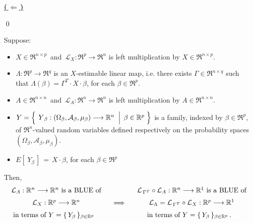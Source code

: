 \vskip 0.5cm
\noindent
\textbf{\underline{(\,$\Longleftarrow$\,)}}\quad

\qed

\begin{proposition}
\mbox{}\vskip 0.1cm\noindent
Suppose:
\begin{itemize}
\item
	$X \in \Re^{n \times p}$\, and 
	\,$\mathcal{L}_{X} : \Re^{p} \longrightarrow \Re^{n}$ is left multiplication by $X \in \Re^{n \times p}$.
\item
	$\Lambda : \Re^{p} \longrightarrow \Re^{q}$ is an $X$-estimable linear map, i.e.
	there exists $\Gamma \in \Re^{n \times q}$ such that
	$\Lambda(\beta) = \Gamma^{T} \cdot X \cdot \beta$, for each $\beta \in \Re^{p}$.
\item
	$A \in \Re^{n \times n}$\, and 
	\,$\mathcal{L}_{A} : \Re^{n} \longrightarrow \Re^{n}$ is left multiplication by $A \in \Re^{n \times n}$.
\item
	$Y = \left\{\;
		\left.
		\overset{{\color{white}.}}{Y}_{\beta} : (\Omega_{\beta},\mathcal{A}_{\beta},\mu_{\beta}) \longrightarrow \Re^{n}
		\;\;\right\vert\;
		\beta \in \Re^{p}
		\;\right\}$
	is a family, indexed by $\beta \in \Re^{p}$,
	of $\Re^{n}$-valued random variables defined respectively on the
	probability spaces $(\Omega_{\beta},\mathcal{A}_{\beta},\mu_{\beta})$.
\item
	$E\!\left[\;Y_{\beta}\,\right] \,=\, X \cdot \beta$, for each $\beta \in \Re^{p}$
\end{itemize}
Then, \vskip -0.5cm
\begin{equation*}
\begin{array}{c}
	\textnormal{$\mathcal{L}_{A} : \Re^{n} \longrightarrow \Re^{n}$ is a BLUE of}
	\\
	\textnormal{$\overset{{\color{white}+}}{\mathcal{L}}_{X} : \Re^{p} \longrightarrow \Re^{n}$}
	\\
	\textnormal{in terms of $Y = \{\,Y_{\beta}\,\}_{\beta\in\Re^{p}}$}
		{\color{white}\overset{+}{\Re}}
	\end{array}
\quad\Longrightarrow\quad
\begin{array}{c}
	\textnormal{$\mathcal{L}_{\,\Gamma^{T}} \circ \mathcal{L}_{A} : \Re^{n} \longrightarrow \Re^{1}$ is a BLUE of}
	\\
	\textnormal{$\mathcal{L}_{\Lambda} = \overset{{\color{white}+}}{\mathcal{L}}_{\,\Gamma^{T}} \circ \mathcal{L}_{X} :
		\Re^{p} \longrightarrow \Re^{1}$}
	\\
	\textnormal{in terms of $Y = \{\,Y_{\beta}\,\}_{\beta\in\Re^{p}}$\,.}
		{\color{white}\overset{+}{\Re}}
	\end{array}
\end{equation*}
\end{proposition}


